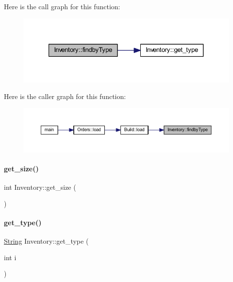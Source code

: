 Here is the call graph for this function\+:
\nopagebreak
\begin{figure}[H]
\begin{center}
\leavevmode
\includegraphics[width=321pt]{class_inventory_a2a5998334229d148aac3e0dc16642480_cgraph}
\end{center}
\end{figure}
Here is the caller graph for this function\+:
\nopagebreak
\begin{figure}[H]
\begin{center}
\leavevmode
\includegraphics[width=350pt]{class_inventory_a2a5998334229d148aac3e0dc16642480_icgraph}
\end{center}
\end{figure}
\mbox{\label{class_inventory_a3ccacc9422b01b2c17836ca804bcaafc}} 
\paragraph{\texorpdfstring{get\_size()}{get\_size()}}
{\footnotesize\ttfamily int Inventory\+::get\+\_\+size (\begin{DoxyParamCaption}{ }\end{DoxyParamCaption})\hspace{0.3cm}{\ttfamily [inline]}}

\mbox{\label{class_inventory_a217895dbb60e3d7643c41fdeeb775bc9}} 
\paragraph{\texorpdfstring{get\_type()}{get\_type()}}
{\footnotesize\ttfamily \mbox{\hyperlink{class_string}{String}} Inventory\+::get\+\_\+type (\begin{DoxyParamCaption}\item[{int}]{i }\end{DoxyParamCaption})\hspace{0.3cm}{\ttfamily [inline]}}

